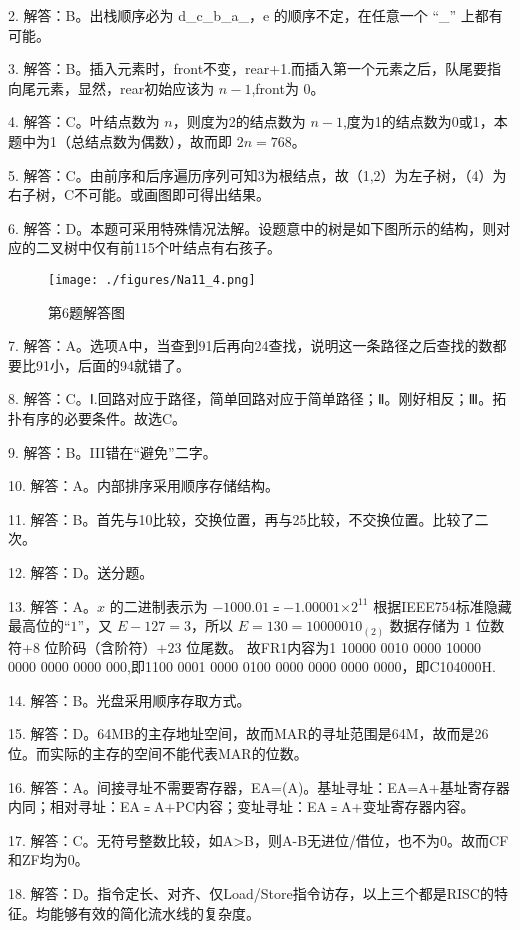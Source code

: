2. 解答：B。出栈顺序必为 d\_c\_b\_a\_，e 的顺序不定，在任意一个 “\_” 上都有可能。

3. 解答：B。插入元素时，front不变，rear+1.而插入第一个元素之后，队尾要指向尾元素，显然，rear初始应该为 $n-1$,front为 $0$。

4. 解答：C。叶结点数为 $n$，则度为2的结点数为 $n-1$,度为1的结点数为0或1，本题中为1（总结点数为偶数），故而即 $2n=768$。

5. 解答：C。由前序和后序遍历序列可知3为根结点，故（1,2）为左子树，（4）为右子树，C不可能。或画图即可得出结果。

6. 解答：D。本题可采用特殊情况法解。设题意中的树是如下图所示的结构，则对应的二叉树中仅有前115个叶结点有右孩子。\\
\begin{figure}[ht]
\centering
\texttt{[image: ./figures/Na11\_4.png]}
\caption{第6题解答图} \label{Na11_fig4}
\end{figure}

7. 解答：A。选项A中，当查到91后再向24查找，说明这一条路径之后查找的数都要比91小，后面的94就错了。

8. 解答：C。Ⅰ.回路对应于路径，简单回路对应于简单路径；Ⅱ。刚好相反；Ⅲ。拓扑有序的必要条件。故选C。

9. 解答：B。III错在“避免”二字。

10. 解答：A。内部排序采用顺序存储结构。

11. 解答：B。首先与10比较，交换位置，再与25比较，不交换位置。比较了二次。

12. 解答：D。送分题。

13. 解答：A。$x$ 的二进制表示为 $-1000.01$﹦$-1.000 01$×$2^{11}$ 根据IEEE754标准隐藏最高位的“$1$”，又 $E-127=3$，所以 $E=130=1000 0010_{(2)}$ 数据存储为 $1$ 位数符+$8$ 位阶码（含阶符）+$23$ 位尾数。
故FR1内容为1 10000 0010 0000 10000 0000 0000 0000 000,即1100 0001 0000 0100 0000 0000 0000 0000，即C104000H.

14. 解答：B。光盘采用顺序存取方式。

15. 解答：D。64MB的主存地址空间，故而MAR的寻址范围是64M，故而是26位。而实际的主存的空间不能代表MAR的位数。

16. 解答：A。间接寻址不需要寄存器，EA=(A)。基址寻址：EA=A+基址寄存器内同；相对寻址：EA﹦A+PC内容；变址寻址：EA﹦A+变址寄存器内容。

17. 解答：C。无符号整数比较，如A>B，则A-B无进位/借位，也不为0。故而CF和ZF均为0。

18. 解答：D。指令定长、对齐、仅Load/Store指令访存，以上三个都是RISC的特征。均能够有效的简化流水线的复杂度。


